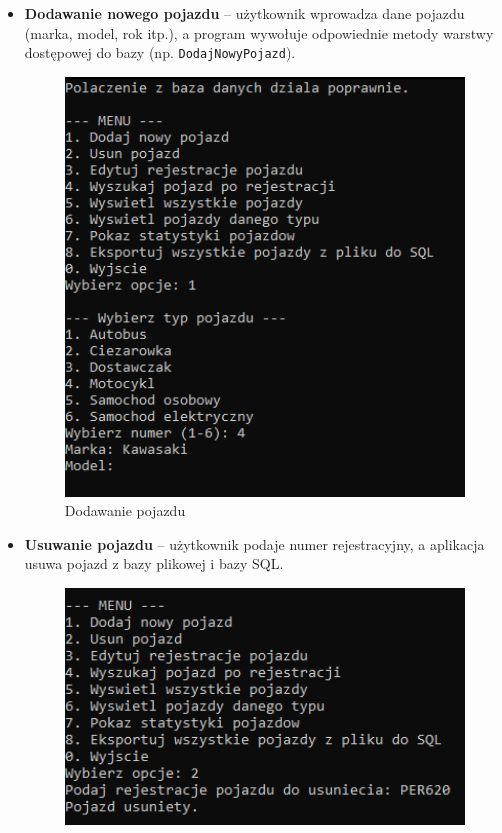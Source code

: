 \begin{itemize}
    \item \textbf{Dodawanie nowego pojazdu} -- użytkownik wprowadza dane pojazdu (marka, model, rok itp.), 
    a program wywołuje odpowiednie metody warstwy dostępowej do bazy (np. \texttt{DodajNowyPojazd}).
    \begin{figure}[H] 
        \centering
        \includegraphics[width=1\textwidth]{Dodawanie.png}
        \caption{Dodawanie pojazdu}
        \label{fig:moj_obrazek}
    \end{figure}
    \item \textbf{Usuwanie pojazdu} -- użytkownik podaje numer rejestracyjny, a aplikacja usuwa pojazd 
    z bazy plikowej i bazy SQL.
    \begin{figure}[H] 
        \centering
        \includegraphics[width=1\textwidth]{Usuwanie.png}

\end{figure}
\end{itemize}
